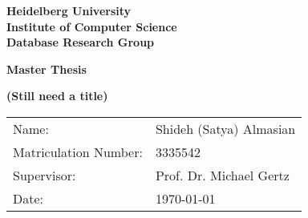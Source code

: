 \begin{titlepage}
  
\vspace*{1cm}
\begin{center}
\vspace*{3cm}
\textbf{ 
\Large Heidelberg University\\
\smallskip
\Large Institute of Computer Science \\
\smallskip
\Large Database Research Group\\
\smallskip
}

\vspace{3cm}

\textbf{\large Master Thesis } %

\vspace{0.5\baselineskip}
{\huge
\textbf{(Still need a title) }
}
\end{center}

\vfill 

{\large
\begin{tabular}[l]{ll}
Name: & Shideh (Satya) Almasian \\
Matriculation Number: & 3335542\\
Supervisor: & Prof. Dr. Michael Gertz\\
Date: & \today
\end{tabular}
}

\end{titlepage}

\newpage
\null
\thispagestyle{empty}
\newpage

